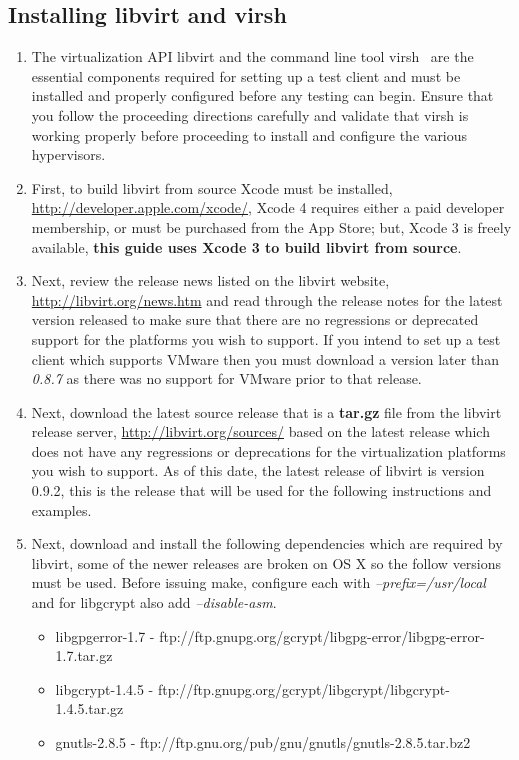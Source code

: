 \subsection{Installing libvirt and virsh}
\label{sec:osxvirsh}
\begin{enumerate}
\item	The virtualization API libvirt and the command line tool virsh~\cite{libvirt} are the essential components required 
		for setting up a test client and must be installed and properly configured before any testing can begin. Ensure that
		you follow the proceeding directions carefully and validate that virsh is working properly before proceeding to 
		install and configure the various hypervisors.

\item	First, to build libvirt from source Xcode must be installed, \url{http://developer.apple.com/xcode/}, Xcode 4 requires 
		either a paid developer membership, or must be purchased from the App Store; but, Xcode 3 is freely available, {\bf this 
		guide uses Xcode 3 to build libvirt from source}.

\item	Next, review the release news listed on the libvirt website, \url{http://libvirt.org/news.htm} and read 
		through the release notes for the latest version released to make sure that there are no regressions or deprecated 
		support for the platforms you wish to support. If you intend to set up a test client which supports VMware then you must 
		download a version later than \emph{0.8.7} as there was no support for VMware prior to that release.

\item	Next, download the latest source release that is a {\bf tar.gz} file from the libvirt release server, 
		\url{http://libvirt.org/sources/} based on the latest release which does not have any regressions or deprecations for
		the virtualization platforms you wish to support. As of this date, the latest release of libvirt is version 0.9.2, this 
		is the release that will be used for the following instructions and examples.
		
\item	Next, download and install the following dependencies which are required by libvirt, some of the newer releases are broken
		on OS X so the follow versions must be used. Before issuing make, configure each with \emph{--prefix=/usr/local} and for
		libgcrypt also add \emph{--disable-asm}.

\begin{itemize}
\item	libgpgerror-1.7	-	ftp://ftp.gnupg.org/gcrypt/libgpg-error/libgpg-error-1.7.tar.gz
\item	libgcrypt-1.4.5 -	ftp://ftp.gnupg.org/gcrypt/libgcrypt/libgcrypt-1.4.5.tar.gz
\item	gnutls-2.8.5 	-	ftp://ftp.gnu.org/pub/gnu/gnutls/gnutls-2.8.5.tar.bz2
\end{itemize}


\end{enumerate}
